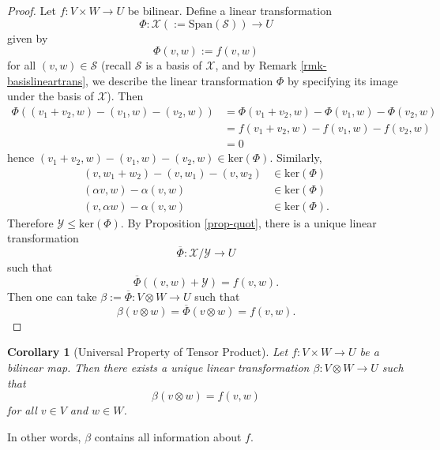 \documentclass[12pt]{amsbook}
\newtheorem{corollary}[theorem]{Corollary}
\begin{document}
\begin{proof}
    \medskip
    Let $f : V \times W \to U$ be bilinear. Define a linear transformation
    $$\Phi : \mathcal{X} (:= \mathrm{Span}(\mathcal{S})) \to U$$
    given by 
    $$\Phi(v, w) := f(v,w)$$
    for all $(v,w) \in \mathcal{S}$ (recall $\mathcal{S}$ is a basis of $\mathcal{X}$, and by Remark \ref{rmk-basislineartrans}, we describe the linear transformation $\Phi$ by specifying its image under the basis of $\mathcal{X}$). Then 
    \begin{align*}
        \Phi((v_1+v_2, w)-(v_1, w)-(v_2, w)) &= \Phi(v_1+v_2, w)- \Phi(v_1, w)- \Phi(v_2, w) \\
        &= f(v_1+v_2, w)-f(v_1, w)-f(v_2, w) \\
        &= 0
    \end{align*}
    hence $(v_1+v_2, w)-(v_1, w)-(v_2, w) \in \mathrm{ker}(\Phi).$
    Similarly,
    \begin{align*}
        (v, w_1+w_2)-(v, w_1)-(v, w_2) &\in \mathrm{ker}(\Phi) \\
        (\alpha v, w)-\alpha (v, w) &\in \mathrm{ker}(\Phi) \\
        (v, \alpha w)-\alpha (v, w) &\in \mathrm{ker}(\Phi).
    \end{align*}
    Therefore $\mathcal{Y} \leq \mathrm{ker}(\Phi)$.
    By Proposition \ref{prop-quot}, there is a unique linear transformation
    $$\overline{\Phi} : \mathcal{X}/\mathcal{Y} \to U$$
    such that
    $$\overline{\Phi}((v, w)+\mathcal{Y}) = f(v, w).$$
    Then one can take $\beta := \overline{\Phi} : V \otimes W \to U$ such that
    $$\beta(v \otimes w) = \overline{\Phi}(v \otimes w) = f(v, w).$$
\end{proof}

\begin{corollary}[Universal Property of Tensor Product]
    Let $f:V \times W \to U$ be a bilinear map. Then there exists a unique linear transformation $\beta: V\otimes W \to U$ such that 
    $$\beta(v \otimes w) = f(v,w)$$
    for all $v \in V$ and $w \in W$. 
\end{corollary}
In other words, $\beta$ contains all information about $f$.
\end{document}
